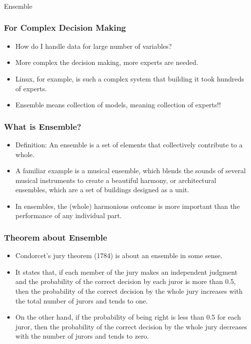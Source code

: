 \begin{frame}[fragile]\frametitle{}
\begin{center}
{\Large Ensemble}
\end{center}
\end{frame}


\begin{frame}[fragile]\frametitle{For Complex Decision Making}
\begin{itemize}
\item How do I handle data for large number of variables?
\item More complex the decision making, more experts are needed.
\item  Linux, for example, is such a complex system that building it took hundreds of experts.
\item Ensemble means collection of models, meaning collection of experts!!
\end{itemize}
\end{frame}

\begin{frame}[fragile]\frametitle{What is Ensemble?}
\begin{itemize}
\item Definition: An ensemble is a set of elements that collectively contribute to a whole. 
\item A familiar example is a musical ensemble, which blends the sounds of several musical instruments to create a beautiful harmony, or architectural ensembles, which are a set of buildings designed as a unit. 
\item In ensembles, the (whole) harmonious outcome is more important than the performance of any individual part.
\end{itemize}
\end{frame}

\begin{frame}[fragile]\frametitle{Theorem about Ensemble}
\begin{itemize}
\item Condorcet's jury theorem (1784) is about an ensemble in some sense. 
\item It states that, if each member of the jury makes an independent judgment and the probability of the correct decision by each juror is more than 0.5, then the probability of the correct decision by the whole jury increases with the total number of jurors and tends to one. 
\item On the other hand, if the probability of being right is less than 0.5 for each juror, then the probability of the correct decision by the whole jury decreases with the number of jurors and tends to zero.
\end{itemize}
\end{frame}

